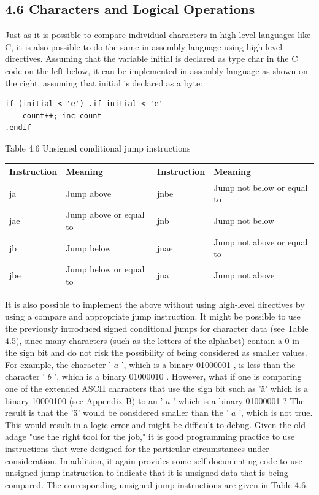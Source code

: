 \documentclass[10pt]{article}
\begin{document}
\subsection*{4.6 Characters and Logical Operations}
Just as it is possible to compare individual characters in high-level languages like C, it is also possible to do the same in assembly language using high-level directives. Assuming that the variable initial is declared as type char in the C code on the left below, it can be implemented in assembly language as shown on the right, assuming that initial is declared as a byte:

\begin{verbatim}
if (initial < 'e') .if initial < 'e'
    count++; inc count
.endif
\end{verbatim}

Table 4.6 Unsigned conditional jump instructions

\begin{center}
\begin{tabular}{|l|l|l|l|}
\hline
Instruction & Meaning & Instruction & Meaning \\
\hline
ja & Jump above & jnbe & Jump not below or equal to \\
\hline
jae & Jump above or equal to & jnb & Jump not below \\
\hline
jb & Jump below & jnae & Jump not above or equal to \\
\hline
jbe & Jump below or equal to & jna & Jump not above \\
\hline
\end{tabular}
\end{center}

It is also possible to implement the above without using high-level directives by using a compare and appropriate jump instruction. It might be possible to use the previously introduced signed conditional jumps for character data (see Table 4.5), since many characters (such as the letters of the alphabet) contain a 0 in the sign bit and do not risk the possibility of being considered as smaller values. For example, the character ' $a$ ', which is a binary 01000001 , is less than the character ' $b$ ', which is a binary 01000010 . However, what if one is comparing one of the extended ASCII characters that use the sign bit such as 'ä' which is a binary 10000100 (see Appendix B) to an ' $a$ ' which is a binary 01000001 ? The result is that the 'ä' would be considered smaller than the ' $a$ ', which is not true. This would result in a logic error and might be difficult to debug. Given the old adage "use the right tool for the job," it is good programming practice to use instructions that were designed for the particular circumstances under consideration. In addition, it again provides some self-documenting code to use unsigned jump instruction to indicate that it is unsigned data that is being compared. The corresponding unsigned jump instructions are given in Table 4.6.
\end{document}

